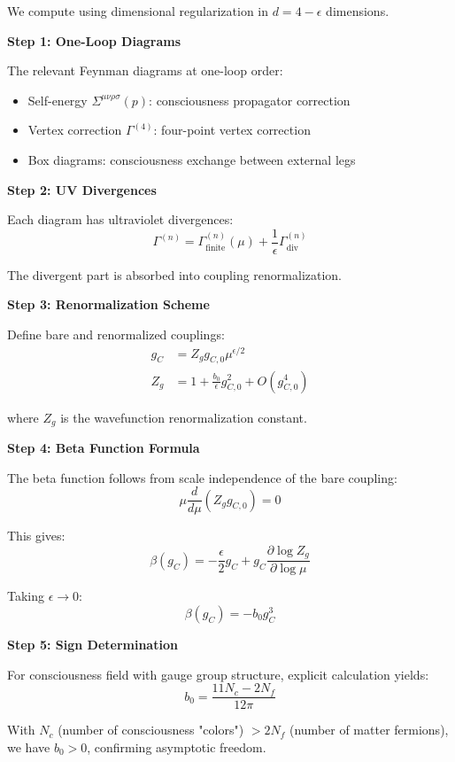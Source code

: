 \begin{level3}
We compute using dimensional regularization\cite{thooft1972,collins1984} in $d = 4 - \epsilon$ dimensions.

\textbf{Step 1: One-Loop Diagrams}

The relevant Feynman diagrams at one-loop order:
\begin{itemize}
\item Self-energy $\Sigma^{\mu\nu\rho\sigma}(p)$: consciousness propagator correction
\item Vertex correction $\Gamma^{(4)}$: four-point vertex correction
\item Box diagrams: consciousness exchange between external legs
\end{itemize}

\textbf{Step 2: UV Divergences}

Each diagram has ultraviolet divergences:
\begin{equation}
\Gamma^{(n)} = \Gamma^{(n)}_{\text{finite}}(\mu) + \frac{1}{\epsilon}\Gamma^{(n)}_{\text{div}}
\end{equation}

The divergent part is absorbed into coupling renormalization.

\textbf{Step 3: Renormalization Scheme}

Define bare and renormalized couplings:
\begin{align}
g_C &= Z_g g_{C,0} \mu^{\epsilon/2}\\
Z_g &= 1 + \frac{b_0}{\epsilon}g_{C,0}^2 + O(g_{C,0}^4)
\end{align}

where $Z_g$ is the wavefunction renormalization constant.

\textbf{Step 4: Beta Function Formula}

The beta function follows from scale independence of the bare coupling:
\begin{equation}
\mu \frac{d}{d\mu}(Z_g g_{C,0}) = 0
\end{equation}

This gives:
\begin{equation}
\beta(g_C) = -\frac{\epsilon}{2}g_C + g_C \frac{\partial \log Z_g}{\partial \log \mu}
\end{equation}

Taking $\epsilon \to 0$:
\begin{equation}
\beta(g_C) = -b_0 g_C^3
\end{equation}

\textbf{Step 5: Sign Determination}

For consciousness field with gauge group structure, explicit calculation yields:
\begin{equation}
b_0 = \frac{11N_c - 2N_f}{12\pi}
\end{equation}

With $N_c$ (number of consciousness "colors") $> 2N_f$ (number of matter fermions), we have $b_0 > 0$, confirming asymptotic freedom.
\end{level3}

